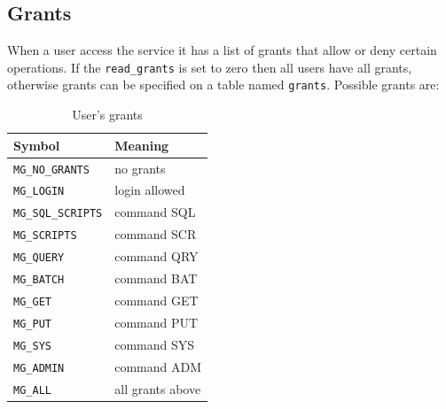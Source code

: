 \documentclass[12pt,titlepage]{book}
\begin{document}
\subsection{Grants}
When a user access the service it has a list of grants that allow or deny
certain operations. If the \verb|read_grants| is set to zero then all users
have all grants, otherwise grants can be specified on a table named
\verb|grants|. Possible grants are:
\begin{table}[!htb] \begin{center}
    \caption{User's grants}\label{tab:grants1}
    \bigskip\bigskip
    \begin{tabular}{|l|l|}
      \hline
      \textbf{Symbol} & \textbf{Meaning} \\
      \hline
      \verb|MG_NO_GRANTS  | &    no grants       \\
      \verb|MG_LOGIN      | &    login allowed   \\
      \verb|MG_SQL_SCRIPTS| &    command SQL	 \\
      \verb|MG_SCRIPTS    | &    command SCR	 \\
      \verb|MG_QUERY      | &    command QRY	 \\
      \verb|MG_BATCH      | &    command BAT	 \\
      \verb|MG_GET        | &    command GET	 \\
      \verb|MG_PUT        | &    command PUT	 \\
      \verb|MG_SYS        | &    command SYS	 \\
      \verb|MG_ADMIN      | &    command ADM	 \\
      \verb|MG_ALL        | &    all grants above\\
      \hline
    \end{tabular}
\end{center} \end{table}
\end{document}

